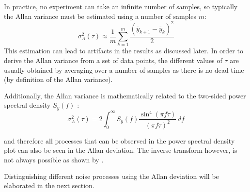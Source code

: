 In practice, no experiment can take an infinite number of samples, so typically the Allan variance must be estimated using a number of samples $m$:
\begin{equation}
    \sigma_A^2(\tau) \approx \frac1 m \sum_{k=1}^m \frac{\left(\bar y_{k+1} - \bar y_{k} \right)^2}{2} \label{eqn:adev_estimator}
\end{equation}
This estimation can lead to artifacts in the results as discussed later. In order to derive the Allan variance from a set of data points, the different values of $\tau$ are usually obtained by averaging over a number of samples as there is no dead time (by definition of the Allan variance).

Additionally, the Allan variance is mathematically related to the two-sided power spectral density $S_y(f)$ \cite{psd_to_adev}:
\begin{equation}
    \sigma_A^2(\tau) = 2 \int_0^\infty S_y(f) \frac{\sin^4\left( \pi f \tau \right)}{(\pi f \tau)^2}\,df \label{eqn:psd_to_adev}
\end{equation}

and therefore all processes that can be observed in the power spectral density plot can also be seen in the Allan deviation. The inverse transform however, is not always possible as shown by \citeauthor{inverse_adev} \cite{inverse_adev}.

Distinguishing different noise processes using the Allan deviation will be elaborated in the next section.

